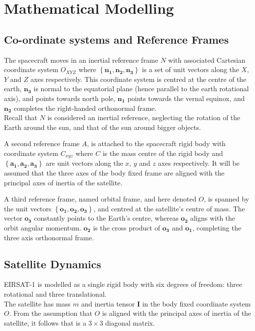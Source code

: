 
\section{Mathematical Modelling}
\subsection{Co-ordinate systems and Reference Frames}

The spacecraft moves in an inertial reference frame $N$ with associated Cartesian coordinate system $O_{XYZ}$ where $\left\{ \mathbf{n_1}, \mathbf{n_2}, \mathbf{n_3} \right\}$ is a set of unit vectors along the $X$, $Y$ and $Z$ axes respectively. This coordinate system is centred at the centre of the earth, $\mathbf{n_3}$ is normal to the equatorial plane (hence parallel to the earth rotational axis), and points towards north pole, $\mathbf{n_1}$ points towards the vernal equinox, and $\mathbf{n_2}$ completes the right-handed orthonormal frame.\\
Recall that $N$ is considered an inertial reference, neglecting the rotation of the Earth around the sun, and that of the sun around bigger objects.

A second reference frame $A$, is attached to the spacecraft rigid body with coordinate system $C_{xyz}$ where $C$ is the mass centre of the rigid body and $ \left\{\mathbf{a_1}, \mathbf{a_2}, \mathbf{a_3} \right\}$ are unit vectors along the $x$, $y$ and $z$ axes respectively. It will be assumed that the three axes of the body fixed frame are aligned with the principal axes of inertia of the satellite. 

A third reference frame, named orbital frame, and here denoted $O$, is spanned by the unit vectors $\left\{\mathbf{o_1}, \mathbf{o_2}, \mathbf{o_3} \right\}$, and centred at the satellite's centre of mass. The vector $\mathbf{o_3}$ constantly points to the Earth's centre, whereas $\mathbf{o_2}$ aligns with the orbit angular momentum. $\mathbf{o_2}$ is the cross product of $\mathbf{o_3}$ and $\mathbf{o_1}$, completing the three axis orthonormal frame.

\subsection{Satellite Dynamics}

EIRSAT-1 is modelled as a single rigid body with six degrees of freedom: three rotational and three translational.\\
The satellite has mass $m$ and inertia tensor $\mathbf{I}$ in the body fixed coordinate system $O$. From the assumption that $O$ is aligned with the principal axes of inertia of the satellite, it follows that is a $3\times 3$ diagonal matrix.

